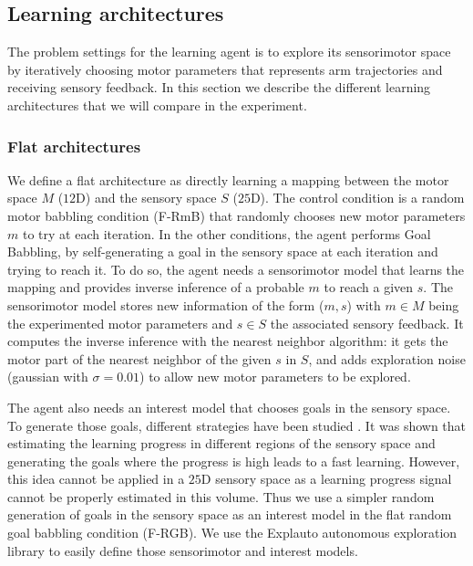 \documentclass[10pt,letterpaper]{article}
\begin{document}
		
	
	\subsection{Learning architectures}

		The problem settings for the learning agent is to explore its sensorimotor space by iteratively choosing motor parameters that represents arm trajectories and receiving sensory feedback.
		In this section we describe the different learning architectures that we will compare in the experiment.
		
		\subsubsection{Flat architectures}
			
			We define a flat architecture as directly learning a mapping between the motor space $M$ ($12$D) and the sensory space $S$ ($25$D).
			The control condition is a random motor babbling condition (F-RmB) that randomly chooses new motor parameters $m$ to try at each iteration.
			In the other conditions, the agent performs Goal Babbling, by self-generating a goal in the sensory space at each iteration and trying to reach it.
			To do so, the agent needs a sensorimotor model that learns the mapping and provides inverse inference of a probable $m$ to reach a given $s$.
			The sensorimotor model stores new information of the form ($m, s$) with $m \in M$ being the experimented motor parameters and $s \in S$ the associated sensory feedback. 
			It computes the inverse inference with the nearest neighbor algorithm: 
			it gets the motor part of the nearest neighbor of the given $s$ in $S$, and adds exploration noise (gaussian with $\sigma=0.01$) to allow new motor parameters to be explored.
			
			The agent also needs an interest model that chooses goals in the sensory space.
			To generate those goals, different strategies have been studied \cite{baranes_active_2013}. 
			It was shown that estimating the learning progress in different regions of the sensory space and generating the goals where the progress is high leads to a fast learning.
			However, this idea cannot be applied in a $25$D sensory space as a learning progress signal cannot be properly estimated in this volume.
			Thus we use a simpler random generation of goals in the sensory space as an interest model in the flat random goal babbling condition (F-RGB).
			We use the Explauto autonomous exploration library \cite{moulin-frier_explauto:_2014} to easily define those sensorimotor and interest models.\\
			
\end{document}
